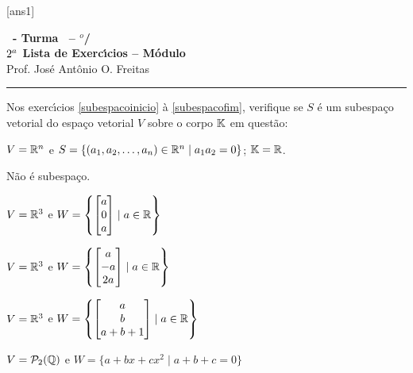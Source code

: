 \documentclass[12pt]{exam}
\begin{document}
  [ans1]
  \begin{center}
    {\Large\bf \disciplina\ - Turma \turma\ -- \semestre$^{o}$/\ano} \\ \vspace{9pt} {\large\bf
        $2^a$ Lista de Exerc{\'\i}cios -- Módulo \numeromodulo}\\ \vspace{9pt} Prof. Jos{\'e} Ant{\^o}nio O. Freitas
  \end{center}
  \hrule





Nos exerc{\'\i}cios \ref{subespacoinicio} \`a \ref{subespacofim}, verifique se $S$ \'e um subespa\c{c}o vetorial do espa\c{c}o vetorial $V$ sobre o corpo $\mathbb{K}$ em quest\~ao:
\begin{exercicio}\label{subespacoinicio}
	$V = \mathbb{R}^n$ e $S = \{(a_1, a_2, \dots, a_n) \in \mathbb{R}^n \mid a_1a_2 = 0\}$; $\mathbb{K} = \mathbb{R}$.
	\begin{solucao}
		N\~ao \'e subespa\c{c}o.
	\end{solucao}
\end{exercicio}

\begin{exercicio}
    $V = \mathbb{R}^3$ e $W = \left\{\begin{bmatrix}a\\0\\a\end{bmatrix} \mid a \in \mathbb{R}\right\}$
\end{exercicio}

\begin{exercicio}
    $V = \mathbb{R}^3$ e $W = \left\{\begin{bmatrix}a\\-a\\2a\end{bmatrix} \mid a \in \mathbb{R}\right\}$
\end{exercicio}

\begin{exercicio}
    $V = \mathbb{R}^3$ e $W = \left\{\begin{bmatrix}a\\b\\a + b + 1\end{bmatrix} \mid a \in \mathbb{R}\right\}$
\end{exercicio}

\begin{exercicio}
    $V = \mathcal{P}_2(\mathbb{Q})$ e $W = \{a + bx + cx^2 \mid a + b + c = 0\}$
\end{exercicio}
\end{document}
